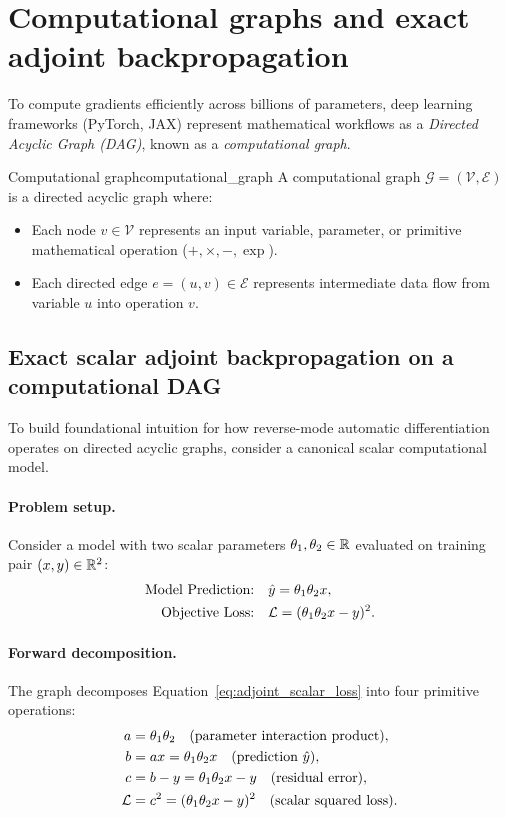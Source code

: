 \documentclass[../../main.tex]{subfiles}
\begin{document}
\clearpage
\section{Computational graphs and exact adjoint backpropagation}
\label{sec:backprop_computational_graph}

To compute gradients efficiently across billions of parameters, deep learning frameworks (PyTorch, JAX) represent mathematical workflows as a \emph{Directed Acyclic Graph (DAG)}, known as a \emph{computational graph}.

\begin{definition}{Computational graph}{computational_graph}
A computational graph $\mathcal{G} = (\mathcal{V}, \mathcal{E})$ is a directed acyclic graph where:
\begin{itemize}
    \item Each node $v \in \mathcal{V}$ represents an input variable, parameter, or primitive mathematical operation ($+, \times, -, \exp$).
    \item Each directed edge $e = (u, v) \in \mathcal{E}$ represents intermediate data flow from variable $u$ into operation $v$.
\end{itemize}
\end{definition}

\subsection{Exact scalar adjoint backpropagation on a computational DAG}
To build foundational intuition for how reverse-mode automatic differentiation operates on directed acyclic graphs, consider a canonical scalar computational model.

\paragraph{Problem setup.}
Consider a model with two scalar parameters $\theta_1, \theta_2 \in \mathbb{R}$ evaluated on training pair $(x, y) \in \mathbb{R}^2$:
\begin{align}
\text{Model Prediction:} \quad &\hat{y} = \theta_1 \theta_2 x, \label{eq:adjoint_scalar_model} \\
\text{Objective Loss:} \quad &\mathcal{L} = (\theta_1 \theta_2 x - y)^2. \label{eq:adjoint_scalar_loss}
\end{align}

\paragraph{Forward decomposition.}
The graph decomposes Equation~\eqref{eq:adjoint_scalar_loss} into four primitive operations:
\begin{align}
a &= \theta_1 \theta_2 \quad (\text{parameter interaction product}), \label{eq:fwd_a} \\
b &= a x = \theta_1 \theta_2 x \quad (\text{prediction } \hat{y}), \label{eq:fwd_b} \\
c &= b - y = \theta_1 \theta_2 x - y \quad (\text{residual error}), \label{eq:fwd_c} \\
\mathcal{L} &= c^2 = (\theta_1 \theta_2 x - y)^2 \quad (\text{scalar squared loss}). \label{eq:fwd_L}
\end{align}
\end{document}
